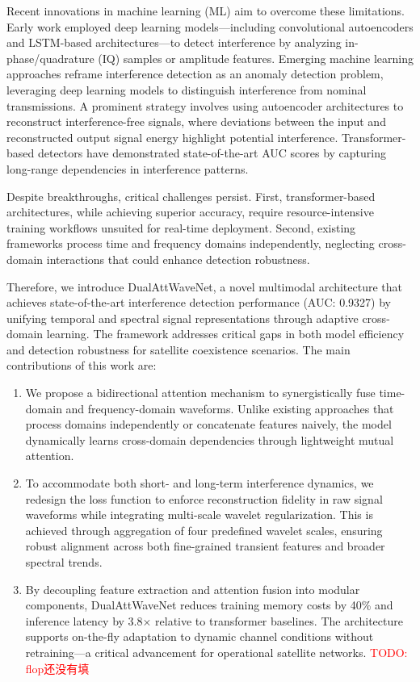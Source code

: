 \documentclass[10pt,twocolumn]{article}
\newcommand{\todo}[1]{\textcolor{red}{TODO: #1}}
\begin{document}
Recent innovations in machine learning (ML) aim to overcome these limitations. Early work employed deep learning models—including convolutional autoencoders\cite{saifaldawlaConvolutionalAutoencodersNonGeostationary2024} and LSTM-based architectures\cite{9384473}—to detect interference by analyzing in-phase/quadrature (IQ) samples or amplitude features. Emerging machine learning approaches reframe interference detection as an anomaly detection problem, leveraging deep learning models to distinguish interference from nominal transmissions.  A prominent strategy involves using autoencoder architectures to reconstruct interference-free signals, where deviations between the input and reconstructed output signal energy highlight potential interference.  Transformer-based detectors have demonstrated state-of-the-art AUC scores by capturing long-range dependencies in interference patterns\cite{saifaldawlaGenAIBasedModelsNGSO2024}.

Despite breakthroughs, critical challenges persist. First, transformer-based architectures, while achieving superior accuracy, require resource-intensive training workflows unsuited for real-time deployment. Second, existing frameworks process time and frequency domains independently, neglecting cross-domain interactions that could enhance detection robustness.

Therefore, we introduce DualAttWaveNet, a novel multimodal architecture that achieves state-of-the-art interference detection performance (AUC: 0.9327) by unifying temporal and spectral signal representations through adaptive cross-domain learning. The framework addresses critical gaps in both model efficiency and detection robustness for satellite coexistence scenarios. The main contributions of this work are:

\begin{enumerate}
    \item We propose a bidirectional attention mechanism to synergistically fuse time-domain and frequency-domain waveforms. Unlike existing approaches that process domains independently or concatenate features naively, the model dynamically learns cross-domain dependencies through lightweight mutual attention.
    \item To accommodate both short- and long-term interference dynamics, we redesign the loss function to enforce reconstruction fidelity in raw signal waveforms while integrating multi-scale wavelet regularization. This is achieved through aggregation of four predefined wavelet scales, ensuring robust alignment across both fine-grained transient features and broader spectral trends.
    \item By decoupling feature extraction and attention fusion into modular components, DualAttWaveNet reduces training memory costs by 40\% and inference latency by 3.8× relative to transformer baselines. The architecture supports on-the-fly adaptation to dynamic channel conditions without retraining—a critical advancement for operational satellite networks. \todo{flop还没有填}
\end{enumerate}
\end{document}

